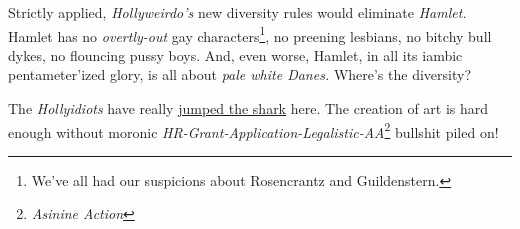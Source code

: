 Strictly applied, \emph{Hollyweirdo's} new diversity rules would
eliminate \emph{Hamlet.} Hamlet has no \emph{overtly-out} gay
characters\footnote{We've all had our suspicions about Rosencrantz and
  Guildenstern.
}, no preening
lesbians, no bitchy bull dykes, no flouncing pussy boys. And, even
worse, Hamlet, in all its iambic pentameter'ized glory, is all about
\emph{pale white Danes.} Where's the diversity?

The \emph{Hollyidiots} have really
\href{https://www.urbandictionary.com/define.php?term=jump-the-shark}{jumped
the shark} here. The creation of art is hard enough without moronic
\emph{HR-Grant-Application-Legalistic-AA}\footnote{\emph{Asinine Action}}
bullshit piled on!





%
